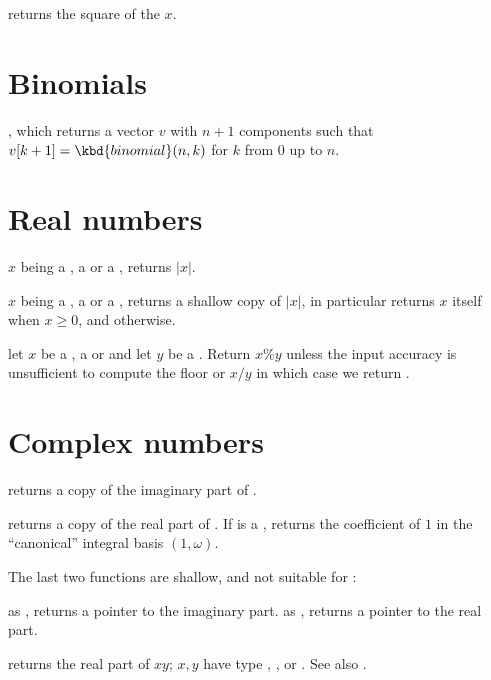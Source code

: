  returns the square of the  $x$.

\section{Binomials}



, which returns a vector $v$ with $n+1$
 components such that $v[k+1] = \kbd{binomial}(n,k)$ for $k$ from
$0$ up to $n$.

\section{Real numbers}

 $x$ being a , a  or a
, returns $|x|$.

 $x$ being a , a  or a
, returns a shallow copy of $|x|$, in particular returns $x$ itself
when $x \geq 0$, and  otherwise.

 let $x$ be a , a  or
 and let $y$ be a . Return $x\% y$ unless the input
accuracy is unsufficient to compute the floor or $x/y$ in which case we
return .

\section{Complex numbers}

 returns a copy of the imaginary part of .

 returns a copy of the real part of . If 
is a , returns the coefficient of $1$ in the ``canonical'' integral
basis $(1,\omega)$.

The last two functions are shallow, and not suitable for :

 as , returns a pointer to the imaginary
part.
 as , returns a pointer to the real part.

 returns the real part of $xy$;
$x,y$ have type , ,  or . See also
.

